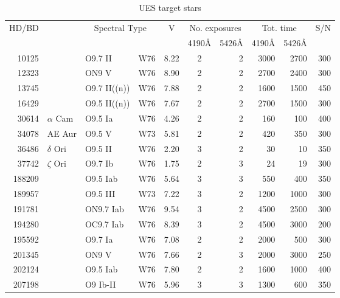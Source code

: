 \begin{table}
\begin{center}
\small %
\caption{UES target stars}
\begin{tabular}{rllrccrrrr}
\\ \hline\hline
HD/BD & \centering{Name} & \multicolumn{2}{c}{Spectral Type} & V &
\multicolumn{2}{c}{No. exposures} & \multicolumn{2}{c}{Tot. time} & S/N\\
& & & & & 4190\AA & 5426\AA &
4190\AA & 5426\AA \\

\hline

10125   &            	& O9.7 II       & W76 & 8.22 & 2 & 2 & 3000 & 2700 & 300 \\
12323   & 		& ON9 V         & W76 & 8.90 & 2 & 2 & 2700 & 2400 & 300 \\
13745   &         	& O9.7 II((n))  & W76 & 7.88 & 2 & 2 & 1600 & 1500 & 450 \\
16429   &               & O9.5 II((n))  & W76 & 7.67 & 2 & 2 & 2700 & 1500 & 300 \\
30614   & $\alpha$ Cam	& O9.5 Ia       & W76 & 4.26 & 2 & 2 &  160 &  100 & 400 \\
34078   & AE Aur 	& O9.5 V        & W73 & 5.81 & 2 & 2 &  420 &  350 & 300 \\
36486   & $\delta$ Ori  & O9.5 II       & W76 & 2.20 & 3 & 2 &   30 &   10 & 350 \\
37742   & $\zeta$ Ori   & O9.7 Ib       & W76 & 1.75 & 2 & 3 &   24 &   19 & 300 \\
188209  & 		& O9.5 Iab      & W76 & 5.64 & 3 & 3 &  550 &  400 & 350 \\
189957  &	        & O9.5 III      & W73 & 7.22 & 3 & 2 & 1200 & 1000 & 300 \\
191781  & 	        & ON9.7 Iab     & W76 & 9.54 & 3 & 2 & 4500 & 2500 & 300 \\
194280  &               & OC9.7 Iab     & W76 & 8.39 & 3 & 2 & 4500 & 3000 & 200 \\
195592  &               & O9.7 Ia       & W76 & 7.08 & 2 & 2 & 2000 &  500 & 300 \\
201345  &               & ON9 V         & W76 & 7.66 & 2 & 3 & 2000 & 3000 & 250 \\
202124  &               & O9.5 Iab      & W76 & 7.80 & 2 & 2 & 1600 & 1000 & 400 \\
207198  &               & O9 Ib-II      & W76 & 5.96 & 3 & 3 & 1300 &  600 & 350 \\

\end{tabular}
\end{center}
\end{table}
